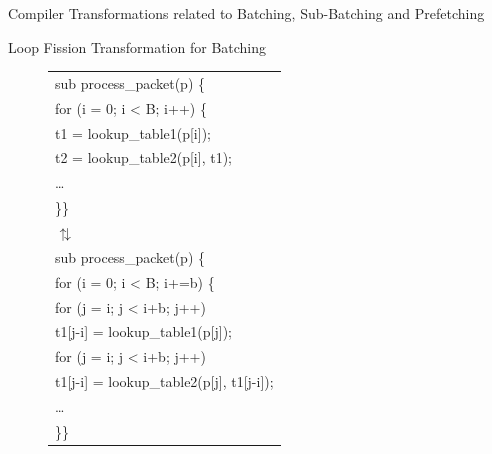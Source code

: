 \documentclass[final]{beamer}
\newlength{\sepwid}
\newlength{\onecolwid}
\newlength{\twocolwid}
\begin{document}
\begin{frame}
\begin{columns}[t]
\begin{column}{\twocolwid}
\begin{exampleblock}{Compiler Transformations related to Batching, Sub-Batching and Prefetching}
\begin{multicols}{3}
\begin{figure}[ht]
\begin{tiny}
\end{tiny}
\end{figure}
Loop Fission\cite{loop_fission} Transformation for Batching
\begin{figure}[ht]
\begin{tiny}
\begin{tabular}[b]{p{\onecolwid}}
sub{ process\_packet}(p) \{ \\
\hspace{0.2\sepwid}for (i = 0; i < B; i++) \{ \\
\hspace{0.4\sepwid}t1 = lookup\_table1(p[i]); \\
\hspace{0.4\sepwid}t2 = lookup\_table2(p[i], t1); \\
\hspace{0.4\sepwid}\ldots\\
\hspace{0.2\sepwid}\}\hspace{0.2\sepwid}\}\\
\vspace{1cm}
\hspace{1\sepwid}$\updownarrows$\\
\vspace{1cm}
sub {process\_packet}(p) \{\\
\hspace{0.2\sepwid}for (i = 0; i < B; i+=b) \{\\
\hspace{0.4\sepwid}for (j = i; j < i+b; j++)\\
\hspace{0.6\sepwid}t1[j-i] = lookup\_table1(p[j]);\\
\hspace{0.4\sepwid}for (j = i; j < i+b; j++)\\
\hspace{0.6\sepwid}t1[j-i] = lookup\_table2(p[j], t1[j-i]);\\
\hspace{0.4\sepwid}\ldots\\
\hspace{0.2\sepwid}\}\hspace{0.2\sepwid}\}
\end{tabular}
\end{tiny}
\end{figure}


\end{multicols}
\end{exampleblock}
\end{column}
\end{columns}
\end{frame}
\end{document}

